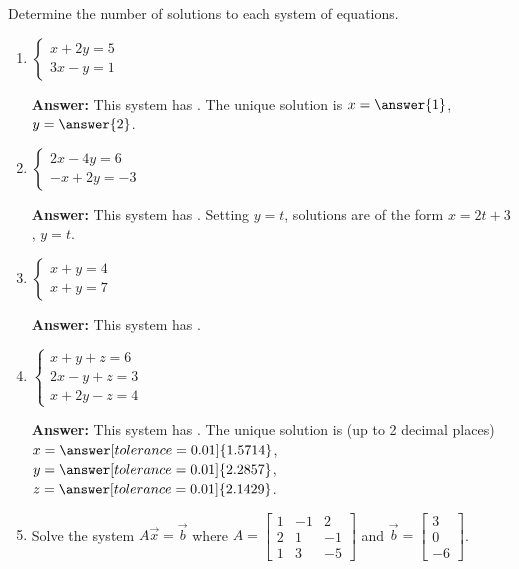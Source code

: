 \documentclass{ximera}
\begin{document}
\begin{example}
    Determine the number of solutions to each system of equations.
    \begin{enumerate}
        \item $\begin{cases} x + 2y = 5 \\ 3x - y = 1 \end{cases}$

        \textbf{Answer:} This system has . The unique solution is $x = \answer{1}$, $y = \answer{2}$.

        \item $\begin{cases} 2x - 4y = 6 \\ -x + 2y = -3 \end{cases}$

        \textbf{Answer:} This system has . Setting $y = t$, solutions are of the form $x = 2t + 3$, $y = t$.

        \item $\begin{cases} x + y = 4 \\ x + y = 7 \end{cases}$

        \textbf{Answer:} This system has .

        \item $\begin{cases} x + y + z = 6 \\ 2x - y + z = 3 \\ x + 2y - z = 4 \end{cases}$

        \textbf{Answer:} This system has . The unique solution is (up to 2 decimal places) $x = \answer[tolerance=0.01]{1.5714}$, $y = \answer[tolerance=0.01]{2.2857}$, $z = \answer[tolerance=0.01]{2.1429}$.

        \item Solve the system $A\vec{x} = \vec{b}$ where $A = \begin{bmatrix} 1 & -1 & 2 \\ 2 & 1 & -1 \\ 1 & 3 & -5 \end{bmatrix}$ and $\vec{b} = \begin{bmatrix} 3 \\ 0 \\ -6 \end{bmatrix}$.


\end{enumerate}
\end{example}
\end{document}
